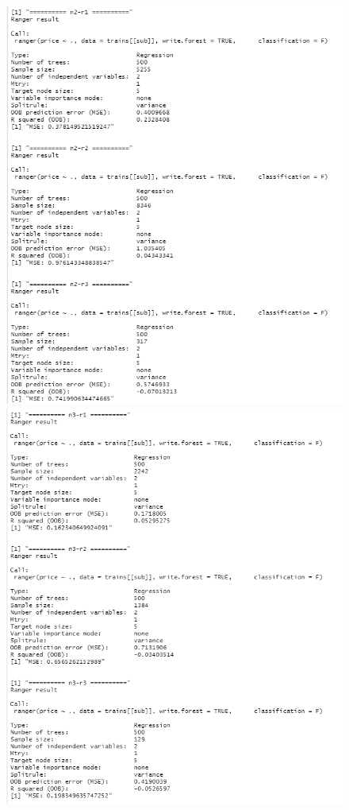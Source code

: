 \documentclass{FR16}
\begin{document}
\begin{figure}[!htb]
\begin{minipage}{0.33\textwidth}
     \includegraphics[width=1\linewidth]{figures/rgn2.2.png}
   \end{minipage}
   \begin{minipage}{0.33\textwidth}
     \centering
     \includegraphics[width=1\linewidth]{figures/rgn2.3.png} 

\end{minipage}
\end{figure}
\end{document}
